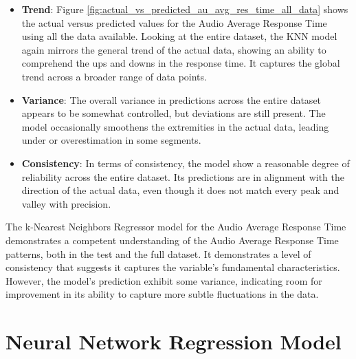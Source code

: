 \begin{itemize}
    \item \textbf{Trend}: Figure \ref{fig:actual_vs_predicted_au_avg_res_time_all_data} shows the actual versus predicted values for the Audio Average Response Time using all the data available. Looking
    at the entire dataset, the KNN model again mirrors the general trend of the actual data, showing an ability to comprehend the ups and downs in the response time. It captures the global trend across a 
    broader range of data points.    
    
    \item \textbf{Variance}: The overall variance in predictions across the entire dataset appears to be somewhat controlled, but deviations are still present. The model occasionally smoothens the extremities 
    in the actual data, leading under or overestimation in some segments.
    
    \item \textbf{Consistency}: In terms of consistency, the model show a reasonable degree of reliability across the entire dataset. Its predictions are in alignment with the direction of the actual data,
    even though it does not match every peak and valley with precision.
    
\end{itemize}


The k-Nearest Neighbors Regressor model for the Audio Average Response Time demonstrates a competent understanding of the Audio Average Response Time patterns, both in the test and the full dataset. It demonstrates 
a level of consistency that suggests it captures the variable's fundamental characteristics. However, the model's prediction exhibit some variance, indicating room for improvement in its ability to capture more
subtle fluctuations in the data.


\section{Neural Network Regression Model}


